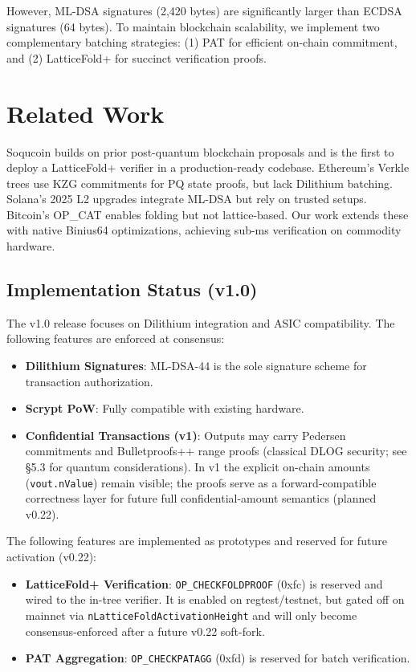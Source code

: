 \documentclass[10pt]{article}
\begin{document}
However, ML-DSA signatures (2,420 bytes) are significantly larger than ECDSA signatures (64 bytes). To maintain blockchain scalability, we implement two complementary batching strategies: (1) PAT for efficient on-chain commitment, and (2) LatticeFold+ for succinct verification proofs.

\section{Related Work}
Soqucoin builds on prior post-quantum blockchain proposals and is the first to deploy a LatticeFold+ verifier in a production-ready codebase. Ethereum's Verkle trees \cite{verkle2024} use KZG commitments for PQ state proofs, but lack Dilithium batching. Solana's 2025 L2 upgrades \cite{solana2025} integrate ML-DSA but rely on trusted setups. Bitcoin's OP\_CAT \cite{opcat2024} enables folding but not lattice-based. Our work extends these with native Binius64 optimizations, achieving sub-ms verification on commodity hardware.

\subsection{Implementation Status (v1.0)}
The v1.0 release focuses on Dilithium integration and ASIC compatibility. The following features are enforced at consensus:
\begin{itemize}
    \item \textbf{Dilithium Signatures}: ML-DSA-44 is the sole signature scheme for transaction authorization.
    \item \textbf{Scrypt PoW}: Fully compatible with existing hardware.
    \item \textbf{Confidential Transactions (v1)}: Outputs may carry Pedersen commitments and Bulletproofs++ range proofs (classical DLOG security; see \S5.3 for quantum considerations). In v1 the explicit on-chain amounts (\texttt{vout.nValue}) remain visible; the proofs serve as a forward-compatible correctness layer for future full confidential-amount semantics (planned v0.22).
\end{itemize}
The following features are implemented as prototypes and reserved for future activation (v0.22):
\begin{itemize}
    \item \textbf{LatticeFold+ Verification}: \texttt{OP\_CHECKFOLDPROOF} (0xfc) is reserved and wired to the in-tree verifier. It is enabled on regtest/testnet, but gated off on mainnet via \texttt{nLatticeFoldActivationHeight} and will only become consensus-enforced after a future v0.22 soft-fork.
    \item \textbf{PAT Aggregation}: \texttt{OP\_CHECKPATAGG} (0xfd) is reserved for batch verification.
\end{itemize}
\end{document}
